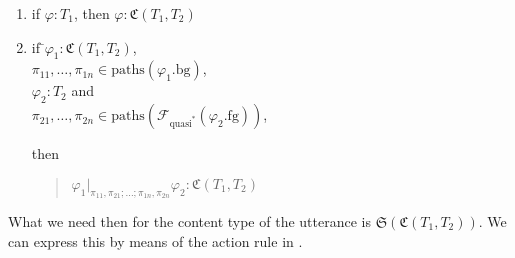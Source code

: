 \begin{shaded}
\begin{enumerate}
\item if $\varphi:T_1$, then $\varphi:\mathfrak{C}(T_1,T_2)$ 
 
\item \begin{tabbing}
    if \=$\varphi_1:\mathfrak{C}(T_1,T_2)$,\\
  \>$\pi_{11},\ldots,\pi_{1n}\in\mathrm{paths}(\varphi_1.\text{bg})$,\\ \>$\varphi_2:T_2$ and\\
\>$\pi_{21},\ldots,\pi_{2n}\in\mathrm{paths}(\mathcal{F}_{\text{quasi}^*}(\varphi_2.\text{fg}))$,
  \end{tabbing}
  then
  \begin{quote}
    $\varphi_1|_{\pi_{11},\pi_{21};\ldots;\pi_{1n},\pi_{2n}}\varphi_2:\mathfrak{C}(T_1,T_2)$
  \end{quote}
  
 
\end{enumerate} 
What we need then for the content type of the utterance is
$\mathfrak{S}(\mathfrak{C}(T_1,T_2))$.  We can express this by means
of the action rule in \nexteg{}.
\end{shaded}
\begin{sidewaysfigure}
\begin{ex}
  
  \begin{prooftree}
  \end{prooftree}
\label{ex:interp-cntxt-previous-utterance}  
\end{ex} 
\end{sidewaysfigure}  
  



  




